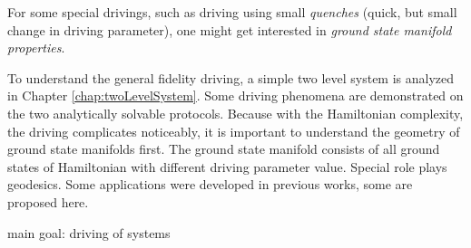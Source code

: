 For some special drivings, such as driving using small \emph{quenches} (quick, but small change in driving parameter), one might get interested in \emph{ground state manifold properties}.

To understand the general fidelity driving, a simple two level system is analyzed in Chapter \ref{chap:twoLevelSystem}. Some driving phenomena are demonstrated on the two analytically solvable protocols. Because with the Hamiltonian complexity, the driving complicates noticeably, it is important to understand the geometry of ground state manifolds first. The ground state manifold consists of all ground states of Hamiltonian with different driving parameter value. Special role plays geodesics. Some applications were developed in previous works, some are proposed here.



main goal: driving of systems